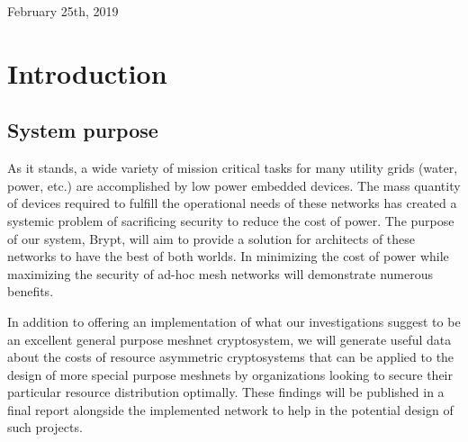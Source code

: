 \documentclass[tikz,a4paper,titlepage]{article}
\begin{document}
\begin{titlepage}

{\large February 25th, 2019}\\[3cm] %




\vfill %

\end{titlepage}

\tableofcontents
\newpage

\section{Introduction}
\subsection{System purpose}
As it stands, a wide variety of mission critical tasks for many utility grids (water, power, etc.) are accomplished by low power embedded devices. The mass quantity of devices required to fulfill the operational needs of these networks has created a systemic problem of sacrificing security to reduce the cost of power. The purpose of our system, Brypt, will aim to provide a solution for architects of these networks to have the best of both worlds. In minimizing the cost of power while maximizing the security of ad-hoc mesh networks will demonstrate numerous benefits.

In addition to offering an implementation of what our investigations suggest to be an excellent general purpose meshnet cryptosystem, we will generate useful data about the costs of resource asymmetric cryptosystems that can be applied to the design of more special purpose meshnets by organizations looking to secure their particular resource distribution optimally. These findings will be published in a final report alongside the implemented network to help in the potential design of such projects.
\end{document}
